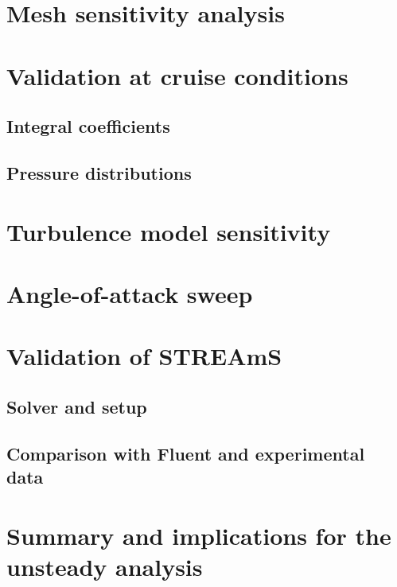 \section{Mesh sensitivity analysis}
\label{sec:val_mesh}

\section{Validation at cruise conditions}
\label{sec:val_cruise}
\subsection{Integral coefficients}
\subsection{Pressure distributions}

\section{Turbulence model sensitivity}
\label{sec:val_turb}

\section{Angle-of-attack sweep}
\label{sec:val_alpha}

\section{Validation of STREAmS}
\label{sec:val_streams}
\subsection{Solver and setup}
\subsection{Comparison with Fluent and experimental data}

\section{Summary and implications for the unsteady analysis}
\label{sec:val_summary}
